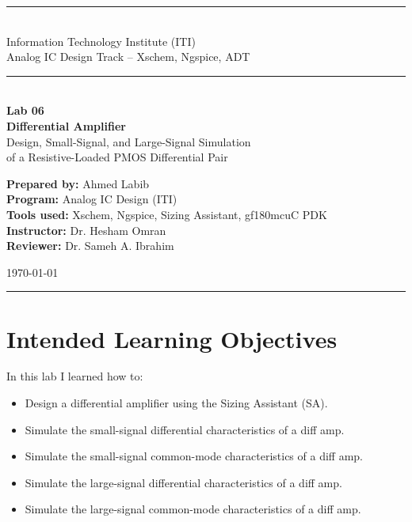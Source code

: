 \documentclass[11pt]{article}
\begin{document}
\begin{titlepage}
\centering
\vspace*{0.5cm}
{\color{itiTeal}\rule{\linewidth}{2pt}}\\[0.3cm]
{\large \color{itiGray} Information Technology Institute (ITI)}\\
{\large \color{itiGray} Analog IC Design Track -- Xschem, Ngspice, ADT}\\[0.3cm]
{\color{itiTeal}\rule{\linewidth}{2pt}}\\[2cm]

{\Huge \bfseries \color{itiTeal} Lab 06}\\[0.4cm]
{\Huge \bfseries \color{itiCrimson} Differential Amplifier}\\[1.2cm]

{\large Design, Small-Signal, and Large-Signal Simulation\\ of a Resistive-Loaded PMOS Differential Pair}\\[2cm]

\begin{tcolorbox}[colback=boxbg,colframe=itiTeal,width=0.7\linewidth,arc=3pt,boxrule=1pt]
\centering
\textbf{Prepared by:} Ahmed Labib \\[4pt]
\textbf{Program:} Analog IC Design (ITI) \\[4pt]
\textbf{Tools used:} Xschem, Ngspice, Sizing Assistant, gf180mcuC PDK \\[4pt]
\textbf{Instructor:} Dr. Hesham Omran \\[4pt]
\textbf{Reviewer:} Dr. Sameh A. Ibrahim
\end{tcolorbox}

\vfill
{\color{itiGray}\today}\\[0.3cm]
{\color{itiTeal}\rule{\linewidth}{2pt}}
\end{titlepage}

\tableofcontents
\newpage

\section*{Intended Learning Objectives}
In this lab I learned how to:
\begin{itemize}[leftmargin=*]
  \item Design a differential amplifier using the Sizing Assistant (SA).
  \item Simulate the small-signal differential characteristics of a diff amp.
  \item Simulate the small-signal common-mode characteristics of a diff amp.
  \item Simulate the large-signal differential characteristics of a diff amp.
  \item Simulate the large-signal common-mode characteristics of a diff amp.
\end{itemize}
\end{document}

